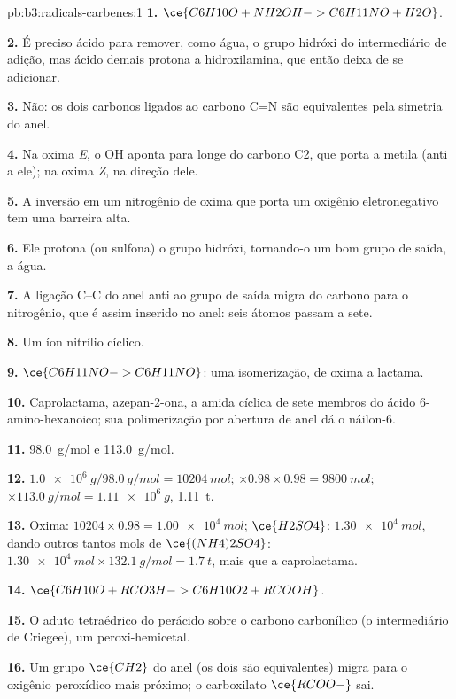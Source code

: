 \begin{solution}{pb:b3:radicals-carbenes:1}
\textbf{1.} $\ce{C6H10O + NH2OH -> C6H11NO + H2O}$.

\textbf{2.} É preciso ácido para remover, como água, o grupo hidróxi do intermediário de adição,
mas ácido demais protona a hidroxilamina, que então deixa de se adicionar.

\textbf{3.} Não: os dois carbonos ligados ao carbono C=N são equivalentes pela
simetria do anel.

\textbf{4.} Na oxima \textit{E}, o OH aponta para longe do carbono C2, que porta a metila (anti a
ele); na oxima \textit{Z}, na direção dele.

\textbf{5.} A inversão em um nitrogênio de oxima que porta um oxigênio eletronegativo tem uma barreira
alta.

\textbf{6.} Ele protona (ou sulfona) o grupo hidróxi, tornando-o um bom grupo de
saída, a água.

\textbf{7.} A ligação C--C do anel anti ao grupo de saída migra do carbono para o nitrogênio,
que é assim inserido no anel: seis átomos passam a sete.

\textbf{8.} Um íon nitrílio cíclico.

\textbf{9.} $\ce{C6H11NO -> C6H11NO}$: uma isomerização, de oxima a lactama.

\textbf{10.} Caprolactama, azepan-2-ona, a amida cíclica de sete membros do
ácido 6-amino-hexanoico; sua polimerização por abertura de anel dá o náilon-6.

\textbf{11.} \qty{98.0}{g/mol} e \qty{113.0}{g/mol}.

\textbf{12.} $\qty{1.0e6}{g}/\qty{98.0}{g/mol} = \qty{10204}{mol}$; $\times 0.98 \times 0.98 = \qty{9800}{mol}$; $\times \qty{113.0}{g/mol} = \qty{1.11e6}{g}$, \qty{1.11}{t}.

\textbf{13.} Oxima: $\num{10204} \times 0.98 = \qty{1.00e4}{mol}$; $\ce{H2SO4}$: $\qty{1.30e4}{mol}$, dando outros tantos mols de
$\ce{(NH4)2SO4}$: $\qty{1.30e4}{mol} \times \qty{132.1}{g/mol} = \qty{1.7}{t}$, mais que a caprolactama.

\textbf{14.} $\ce{C6H10O + RCO3H -> C6H10O2 + RCOOH}$.

\textbf{15.} O aduto tetraédrico do perácido sobre o carbono carbonílico (o
intermediário de Criegee), um peroxi-hemicetal.

\textbf{16.} Um grupo $\ce{CH2}$ do anel (os dois são equivalentes) migra para o oxigênio
peroxídico mais próximo; o carboxilato $\ce{RCOO-}$ sai.


\end{solution}
